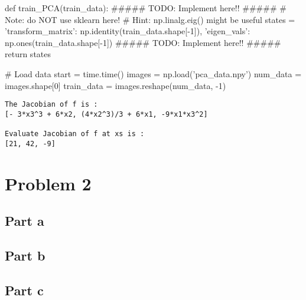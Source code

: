 \documentclass[a4paper, 12pt]{article}
\begin{document}
\begin{sloppypar}
\begin{python}
def train_PCA(train_data):
  ##### TODO: Implement here!! #####
  # Note: do NOT use sklearn here!
  # Hint: np.linalg.eig() might be useful
  states = {
      'transform_matrix': np.identity(train_data.shape[-1]),
      'eigen_vals': np.ones(train_data.shape[-1])
  }
  ##### TODO: Implement here!! #####
  return states

# Load data
start = time.time()
images = np.load('pca_data.npy')
num_data = images.shape[0]
train_data = images.reshape(num_data, -1)

\end{python}


\begin{verbatim}
The Jacobian of f is : 
[- 3*x3^3 + 6*x2, (4*x2^3)/3 + 6*x1, -9*x1*x3^2]
 
Evaluate Jacobian of f at xs is : 
[21, 42, -9]
\end{verbatim}









\clearpage
\section{Problem 2}

\subsection{Part a}
\subsection{Part b}
\subsection{Part c}




\end{sloppypar}
\end{document}
